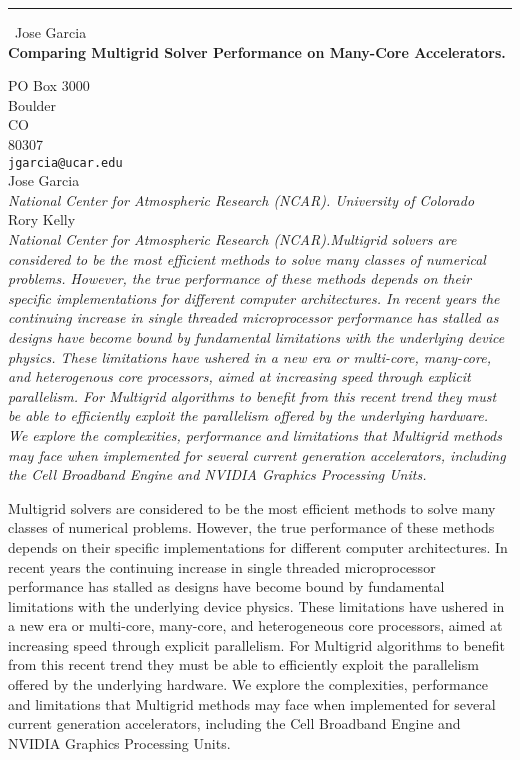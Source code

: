 \documentclass{report}
\begin{document}
\begin{center}
\rule{6in}{1pt} \
{\large Jose Garcia \\
{\bf Comparing Multigrid Solver Performance on Many-Core Accelerators.}}

PO Box 3000 \\ Boulder \\ CO \\ 80307
\\
{\tt jgarcia@ucar.edu}\\
Jose Garcia\\
{\em National Center for Atmospheric Research (NCAR).
University of Colorado}\\
Rory Kelly\\
{\em National Center for Atmospheric Research (NCAR).Multigrid solvers are considered to be the most efficient methods to solve
many classes of numerical problems.  However, the true performance of these
methods depends on their specific implementations for different
computer architectures.  In recent years the continuing increase in single
threaded microprocessor performance has stalled as designs have become
bound by fundamental limitations with the underlying device physics.  These
limitations have ushered in a new era or multi-core, many-core, and heterogenous
core processors, aimed at increasing speed through explicit parallelism. For
Multigrid algorithms to benefit from this recent trend they must be able to
efficiently exploit the parallelism offered by the underlying hardware. We explore
the complexities, performance and limitations that Multigrid methods may face
when implemented for several current generation accelerators, including the
Cell Broadband Engine and NVIDIA Graphics Processing Units.}\end{center}

Multigrid solvers are considered to be the most efficient methods to
solve many classes of numerical problems. However, the true performance
of these methods depends on their specific implementations for different
computer architectures. In recent years the continuing increase in single
threaded microprocessor performance has stalled as designs have become
bound by fundamental limitations with the underlying device physics.
These
limitations have ushered in a new era or multi-core, many-core, and
heterogeneous core processors, aimed at increasing speed through explicit
parallelism. For Multigrid algorithms to benefit from this recent trend
they must be able to efficiently exploit the parallelism offered by the
underlying hardware. We explore
the complexities, performance and limitations that Multigrid methods may
face when implemented for several current generation accelerators,
including the Cell Broadband Engine and NVIDIA Graphics Processing Units.
\end{document}
